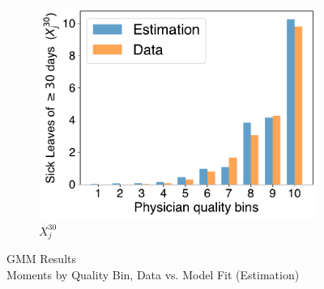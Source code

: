 \documentclass[../main.tex]{subfiles}
\begin{document}
\begin{figure}[H]
\begin{subfigure}[b]{0.46\linewidth}
    \end{subfigure}
    \hspace{0.05\linewidth}  %
    \begin{subfigure}[b]{0.46\linewidth}
        \centering
        \includegraphics[width=\linewidth]{result_x30.pdf}
        
        \caption{$X_j^{30}$}
    \end{subfigure}


\caption{GMM Results \\ Moments by Quality Bin, Data vs. Model Fit (Estimation)}

\end{figure}

\newpage
\end{document}
